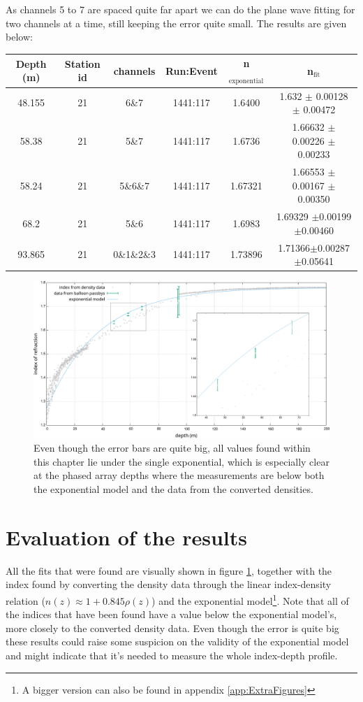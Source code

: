 As channels 5 to 7 are spaced quite far apart we can do the plane wave fitting 
for two channels at a time, still keeping the error quite small. The results are given below:
\begin{center}
\begin{tabular}{||c c c c c c||}
 \hline
 Depth (m) & Station id & channels & Run:Event & n$_\text{exponential}$ & n$_\text{fit}$\\ 
 \hline\hline
 48.155 & 21 & 6\&7 & 1441:117 & 1.6400 & 1.632 $\pm$ 0.00128 $\pm$ 0.00472\\
 58.38 & 21 & 5\&7 & 1441:117 & 1.6736 & 1.66632 $\pm$ 0.00226 $\pm$ 0.00233 \\
 58.24 & 21 & 5\&6\&7 & 1441:117 & 1.67321 & 1.66553 $\pm$ 0.00167 $\pm$ 0.00350 \\
 68.2 & 21 & 5\&6 & 1441:117 & 1.6983 & 1.69329 $\pm$0.00199$\pm$0.00460 \\
 93.865 & 21 & 0\&1\&2\&3 & 1441:117 & 1.73896 & 1.71366$\pm$0.00287$\pm$0.05641\\
 \hline
\end{tabular}
\end{center}
\begin{figure}
	\centering
	\includegraphics[width=\textwidth]{figures/ResultWithZoom.pdf}
  \caption{Even though the error bars are quite big, all values found within this chapter lie under the single exponential, 
    which is especially clear at the phased array depths where the measurements
    are below both the exponential model and the data from the converted densities.}
	\label{fig:Results}
\end{figure}
\section{Evaluation of the results}
All the fits that were found are visually shown in figure \ref{fig:Results},  together
with the index found by converting the density data through the linear index-density relation
($n(z) \approx 1 + 0.845\rho(z)$) and the exponential model\footnote{A bigger version can also be found in appendix \ref{app:ExtraFigures}}.
Note that all of the indices that have been found have a value below the
exponential model's, more closely to the converted density data.
Even though the error is quite big these results could raise some
suspicion on the validity of the exponential model and might indicate
that it's needed to measure the whole index-depth profile.

